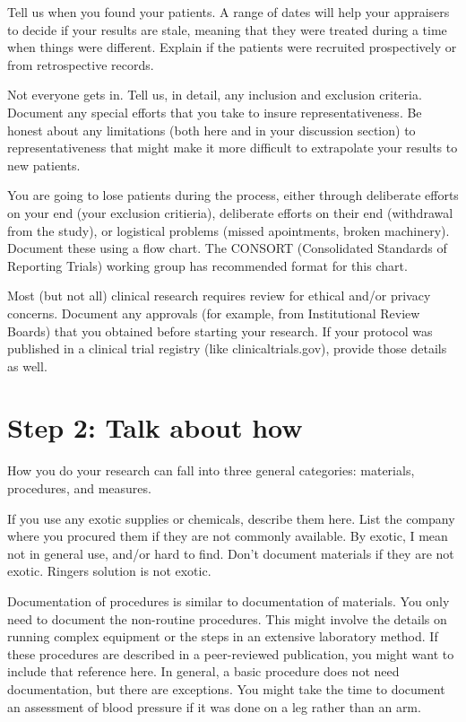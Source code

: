 \documentclass[
  letterpaper,
  DIV=11,
  numbers=noendperiod]{scrreprt}
\begin{document}
\begin{tcolorbox}
Tell us when you found your patients. A range of dates will help your
appraisers to decide if your results are stale, meaning that they were
treated during a time when things were different. Explain if the
patients were recruited prospectively or from retrospective records.

Not everyone gets in. Tell us, in detail, any inclusion and exclusion
criteria. Document any special efforts that you take to insure
representativeness. Be honest about any limitations (both here and in
your discussion section) to representativeness that might make it more
difficult to extrapolate your results to new patients.

You are going to lose patients during the process, either through
deliberate efforts on your end (your exclusion critieria), deliberate
efforts on their end (withdrawal from the study), or logistical problems
(missed apointments, broken machinery). Document these using a flow
chart. The CONSORT (Consolidated Standards of Reporting Trials) working
group has recommended format for this chart.

Most (but not all) clinical research requires review for ethical and/or
privacy concerns. Document any approvals (for example, from
Institutional Review Boards) that you obtained before starting your
research. If your protocol was published in a clinical trial registry
(like clinicaltrials.gov), provide those details as well.

\section{Step 2: Talk about how}\label{step-2-talk-about-how}

How you do your research can fall into three general categories:
materials, procedures, and measures.

If you use any exotic supplies or chemicals, describe them here. List
the company where you procured them if they are not commonly available.
By exotic, I mean not in general use, and/or hard to find. Don't
document materials if they are not exotic. Ringers solution is not
exotic.

Documentation of procedures is similar to documentation of materials.
You only need to document the non-routine procedures. This might involve
the details on running complex equipment or the steps in an extensive
laboratory method. If these procedures are described in a peer-reviewed
publication, you might want to include that reference here. In general,
a basic procedure does not need documentation, but there are exceptions.
You might take the time to document an assessment of blood pressure if
it was done on a leg rather than an arm.


\end{tcolorbox}
\end{document}
